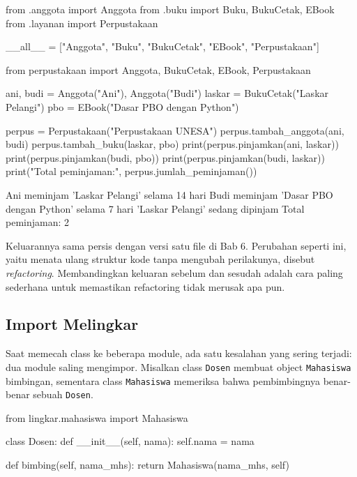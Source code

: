 \begin{kode}
from .anggota import Anggota
from .buku import Buku, BukuCetak, EBook
from .layanan import Perpustakaan

__all__ = ["Anggota", "Buku", "BukuCetak", "EBook", "Perpustakaan"]
\end{kode}

\begin{kode}[main.py]
from perpustakaan import Anggota, BukuCetak, EBook, Perpustakaan

ani, budi = Anggota("Ani"), Anggota("Budi")
laskar = BukuCetak("Laskar Pelangi")
pbo = EBook("Dasar PBO dengan Python")

perpus = Perpustakaan("Perpustakaan UNESA")
perpus.tambah_anggota(ani, budi)
perpus.tambah_buku(laskar, pbo)
print(perpus.pinjamkan(ani, laskar))
print(perpus.pinjamkan(budi, pbo))
print(perpus.pinjamkan(budi, laskar))
print("Total peminjaman:", perpus.jumlah_peminjaman())
\end{kode}

\begin{keluaran}
Ani meminjam 'Laskar Pelangi' selama 14 hari
Budi meminjam 'Dasar PBO dengan Python' selama 7 hari
'Laskar Pelangi' sedang dipinjam
Total peminjaman: 2
\end{keluaran}

Keluarannya sama persis dengan versi satu file di Bab 6. Perubahan seperti ini, yaitu menata ulang struktur kode tanpa mengubah perilakunya, disebut \emph{refactoring}. Membandingkan keluaran sebelum dan sesudah adalah cara paling sederhana untuk memastikan refactoring tidak merusak apa pun.

\subsection{Import Melingkar}

Saat memecah class ke beberapa module, ada satu kesalahan yang sering terjadi: dua module saling mengimpor. Misalkan class \texttt{Dosen} membuat object \texttt{Mahasiswa} bimbingan, sementara class \texttt{Mahasiswa} memeriksa bahwa pembimbingnya benar-benar sebuah \texttt{Dosen}.

\begin{kode}
from lingkar.mahasiswa import Mahasiswa

class Dosen:
    def __init__(self, nama):
        self.nama = nama

    def bimbing(self, nama_mhs):
        return Mahasiswa(nama_mhs, self)
\end{kode}

